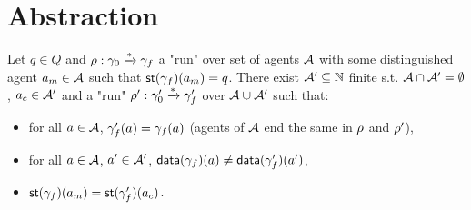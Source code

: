 \section{Abstraction}
\label{sec:abstraction}



\begin{lemma}\label{lem:weak_copycat}
Let $q \in Q$ and  $\rho : \gamma_0 \xrightarrow{*} \gamma_f$ a "run" over set of agents $\mathcal{A}$ with some distinguished agent $a_m \in \mathcal{A}$ such that $\mathsf{st}(\gamma_f)(a_m) = q$. There exist $\mathcal{A}' \subseteq \mathbb{N}$ finite s.t. $\mathcal{A} \cap \mathcal{A}' = \emptyset$, $a_c \in \mathcal{A}'$ and a "run" $\rho': \gamma_0' \xrightarrow{*} \gamma_f'$ over $\mathcal{A} \cup \mathcal{A}'$ such that:
\begin{itemize}
\item for all $a \in \mathcal{A}$, $\gamma_f'(a) = \gamma_f(a)$ (agents of $\mathcal{A}$ end the same in $\rho$ and $\rho'$),
\item for all $a \in \mathcal{A}$, $a' \in \mathcal{A}'$, $\mathsf{data}(\gamma_f)(a) \ne \mathsf{data}(\gamma_f')(a')$,
\item $\mathsf{st}(\gamma_f)(a_m) = \mathsf{st}(\gamma_f')(a_c)$.
\end{itemize}
\end{lemma}



